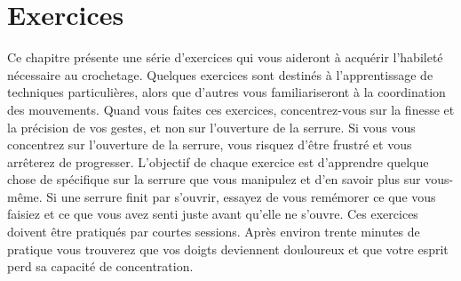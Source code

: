 \documentclass[a4paper,french,11pt,twoside]{report}
\begin{document}
\chapter{Exercices}
Ce chapitre présente une série d'exercices qui vous aideront à acquérir l'habileté nécessaire au crochetage. Quelques exercices sont destinés à l'apprentissage de techniques particulières, alors que d'autres vous familiariseront à la coordination des mouvements. Quand vous faites ces exercices, concentrez-vous sur la finesse et la précision de vos gestes, et non sur l'ouverture de la serrure. Si vous vous concentrez sur l'ouverture de la serrure, vous risquez d'être frustré et vous arrêterez de progresser. L'objectif de chaque exercice est d'apprendre quelque chose de spécifique sur la serrure que vous manipulez et d'en savoir plus sur vous-même. Si une serrure finit par s'ouvrir, essayez de vous remémorer ce que vous faisiez et ce que vous avez senti juste avant qu'elle ne s'ouvre.
Ces exercices doivent être pratiqués par courtes sessions. Après environ trente minutes de pratique vous trouverez que vos doigts deviennent douloureux et que votre esprit perd sa capacité de concentration.
\end{document}
